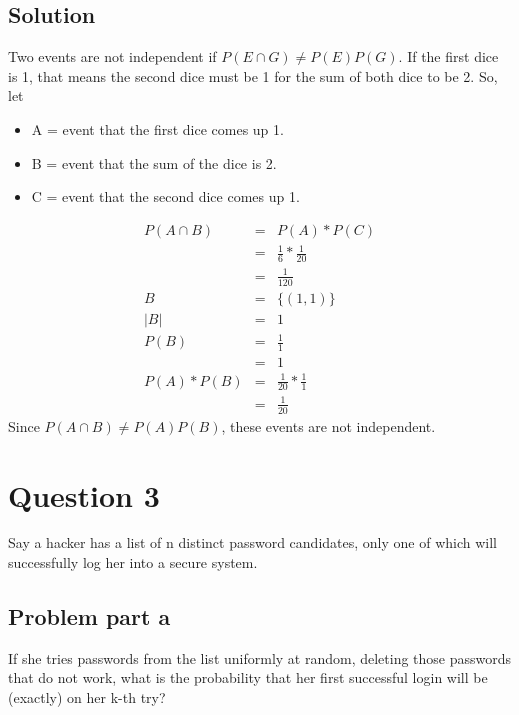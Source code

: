 \documentclass[12pt]{article}%
\newcommand\abs[1]{\left|#1\right|}
\begin{document}
\subsection*{Solution}
Two events are not independent if $P(E \cap G) \neq P(E)P(G)$. If the first dice is 1, that means the second dice must be 1 for the sum of both dice to be 2. So, let 
\begin{itemize}
\item A = event that the first dice comes up 1.
\item B = event that the sum of the dice is 2.
\item C = event that the second dice comes up 1.
\end{itemize}
\begin{eqnarray*}
P(A \cap B) & = & P(A) * P(C) \\
			& = & \frac{1}{6} * \frac{1}{20} \\
			& = & \frac{1}{120} \\
B & = & \{(1,1)\} \\
\abs{B} & = & 1 \\
P(B) & = & \frac{1}{1} \\
	 & = & 1 \\
P(A) * P(B) & = & \frac{1}{20} * \frac{1}{1} \\
			& = & \frac{1}{20}
\end{eqnarray*}
Since $P(A \cap B) \neq P(A)P(B)$, these events are not independent. 
 
\newpage
\section*{Question 3}
Say a hacker has a list of n distinct password candidates, only one of which will successfully log her into a secure system.
\subsection*{Problem part a}
If she tries passwords from the list uniformly at random, deleting those passwords that do not work, what is the probability that her first successful login will be (exactly) on her k-th try?
\end{document}
